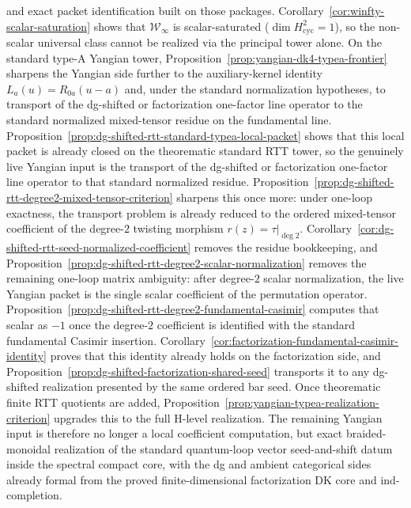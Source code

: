 \begin{remark}
\begin{itemize}
  and exact packet identification built on those packages.
  Corollary~\ref{cor:winfty-scalar-saturation} shows that
  $\mathcal{W}_\infty$ is scalar-saturated
  ($\dim H^2_{\mathrm{cyc}} = 1$), so the non-scalar universal
  class cannot be realized via the principal tower alone.
  On the
  standard type-A Yangian tower, Proposition~\ref{prop:yangian-dk4-typea-frontier}
  sharpens the Yangian side further to the auxiliary-kernel identity
  $L_a(u)=R_{0a}(u-a)$ and, under the standard normalization
  hypotheses, to transport of the dg-shifted or factorization
  one-factor line operator to the standard normalized mixed-tensor
  residue on the fundamental line.  Proposition~\ref{prop:dg-shifted-rtt-standard-typea-local-packet}
  shows that this local packet is already closed on the theorematic
  standard RTT tower, so the genuinely live Yangian input is the
  transport of the dg-shifted or factorization one-factor line
  operator to that standard normalized residue.
  Proposition~\ref{prop:dg-shifted-rtt-degree2-mixed-tensor-criterion}
  sharpens this once more: under one-loop exactness, the transport
  problem is already reduced to the ordered mixed-tensor coefficient of
  the degree-$2$ twisting morphism $r(z)=\tau|_{\deg 2}$.
  Corollary~\ref{cor:dg-shifted-rtt-seed-normalized-coefficient}
  removes the residue bookkeeping, and
  Proposition~\ref{prop:dg-shifted-rtt-degree2-scalar-normalization}
  removes the remaining one-loop matrix ambiguity: after
  degree-$2$ scalar normalization, the live Yangian packet is the
  single scalar coefficient of the permutation operator.
  Proposition~\ref{prop:dg-shifted-rtt-degree2-fundamental-casimir}
  computes that scalar as $-1$ once the degree-$2$ coefficient is
  identified with the standard fundamental Casimir insertion.
  Corollary~\ref{cor:factorization-fundamental-casimir-identity}
  proves that this identity already holds on the factorization side, and
  Proposition~\ref{prop:dg-shifted-factorization-shared-seed}
  transports it to any dg-shifted realization presented by the same
  ordered bar seed.  Once theorematic finite RTT quotients are added,
  Proposition~\ref{prop:yangian-typea-realization-criterion} upgrades
  this to the full H-level realization.  The remaining Yangian input is
  therefore no longer a local coefficient computation, but exact
  braided-monoidal realization of the standard quantum-loop vector
  seed-and-shift datum inside the spectral compact core,
  with the dg and ambient categorical sides already formal from the
  proved finite-dimensional factorization DK core and ind-completion.

\end{itemize}
\end{remark}
